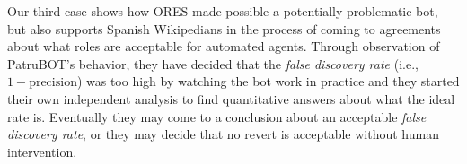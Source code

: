 Our third case shows how ORES made possible a potentially problematic bot, but also supports Spanish Wikipedians in the process of coming to agreements about what roles are acceptable for automated agents.  Through observation of PatruBOT's behavior, they have decided that the \emph{false discovery rate} (i.e., $1 - \text{precision}$) was too high by watching the bot work in practice and they started their own independent analysis to find quantitative answers about what the ideal rate is.  Eventually they may come to a conclusion about an acceptable \emph{false discovery rate}, or they may decide that no revert is acceptable without human intervention.
